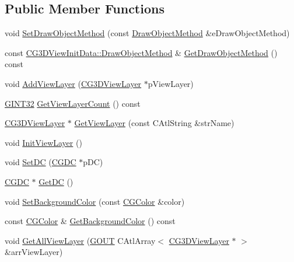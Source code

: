 \subsection*{Public Member Functions}
\begin{DoxyCompactItemize}
\item 
void \hyperlink{class_c_g3_d_view_init_data_a5fc8c9685af8ad48b01e9a621847996c}{Set\+Draw\+Object\+Method} (const \hyperlink{class_c_g3_d_view_init_data_a87424491f9faef1783b3b08114a2ebb0}{Draw\+Object\+Method} \&e\+Draw\+Object\+Method)
\item 
const \hyperlink{class_c_g3_d_view_init_data_a87424491f9faef1783b3b08114a2ebb0}{C\+G3\+D\+View\+Init\+Data\+::\+Draw\+Object\+Method} \& \hyperlink{class_c_g3_d_view_init_data_a3f06c318434d7dc092afef409a398a1a}{Get\+Draw\+Object\+Method} () const 
\item 
void \hyperlink{class_c_g3_d_view_init_data_ab43d61f8a7353cf6c96038c02be90f46}{Add\+View\+Layer} (\hyperlink{class_c_g3_d_view_layer}{C\+G3\+D\+View\+Layer} $\ast$p\+View\+Layer)
\item 
\hyperlink{_g_types_8h_a40d8bc7c06b9e72906852691a4bf888e}{G\+I\+N\+T32} \hyperlink{class_c_g3_d_view_init_data_a468940e5e6579279d71f877430711b58}{Get\+View\+Layer\+Count} () const 
\item 
\hyperlink{class_c_g3_d_view_layer}{C\+G3\+D\+View\+Layer} $\ast$ \hyperlink{class_c_g3_d_view_init_data_af3ff46cffe130591fdad8017894a6291}{Get\+View\+Layer} (const C\+Atl\+String \&str\+Name)
\item 
void \hyperlink{class_c_g3_d_view_init_data_a142a8abacea9766901cbf8fb5bf5f18b}{Init\+View\+Layer} ()
\item 
void \hyperlink{class_c_g3_d_view_init_data_ab38991a9efef8bb0ac9af77acb33bba3}{Set\+D\+C} (\hyperlink{class_c_g_d_c}{C\+G\+D\+C} $\ast$p\+D\+C)
\item 
\hyperlink{class_c_g_d_c}{C\+G\+D\+C} $\ast$ \hyperlink{class_c_g3_d_view_init_data_ae8072ecff28eb0cb7aea4e80530e174f}{Get\+D\+C} ()
\item 
void \hyperlink{class_c_g3_d_view_init_data_a0230bdfc30be829c99d5588188cf32a8}{Set\+Background\+Color} (const \hyperlink{class_c_g_color}{C\+G\+Color} \&color)
\item 
const \hyperlink{class_c_g_color}{C\+G\+Color} \& \hyperlink{class_c_g3_d_view_init_data_ab697c41e84d3e6007756362d21733a5c}{Get\+Background\+Color} () const 
\item 
void \hyperlink{class_c_g3_d_view_init_data_a41ca90f9b474fd489937717d1503cf99}{Get\+All\+View\+Layer} (\hyperlink{_g_types_8h_a0858ec221262e635612871d70ca233ad}{G\+O\+U\+T} C\+Atl\+Array$<$ \hyperlink{class_c_g3_d_view_layer}{C\+G3\+D\+View\+Layer} $\ast$ $>$ \&arr\+View\+Layer)

\end{DoxyCompactItemize}
